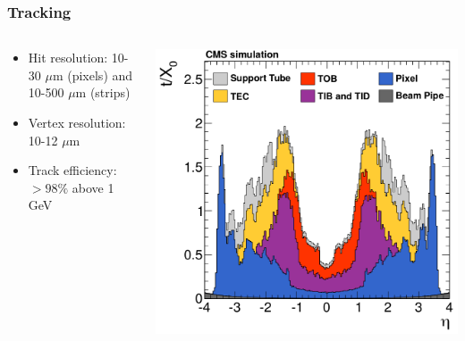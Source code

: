\documentclass[aspectratio=169,xcolor=dvipsnames,,table,compress]{beamer}
\begin{document}
\begin{frame} \frametitle{Tracking}
  \begin{columns}
    \begin{column}{0.6\textwidth}
      \begin{itemize}
        \item Hit resolution: 10-30 $\mu$m (pixels) and 10-500 $\mu$m (strips)
        \item Vertex resolution: 10-12 $\mu$m
        \item Track efficiency: $>98\%$ above 1 GeV
      \end{itemize}
    \end{column}
    \begin{column}{0.4\textwidth}
        \includegraphics[width=\textwidth]{../figures/cms/tracker_material.png}
    \end{column}
  \end{columns}
\end{frame}
\end{document}
